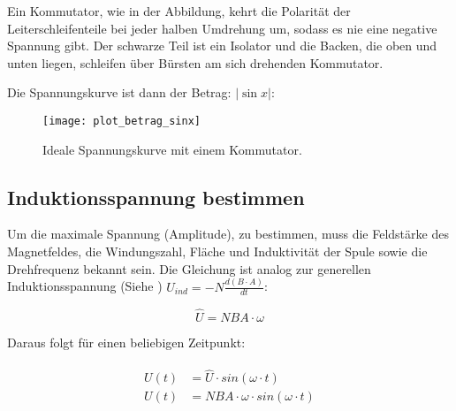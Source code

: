 Ein Kommutator, wie in der Abbildung, kehrt die Polarität der Leiterschleifenteile bei jeder halben Umdrehung um, sodass es nie eine negative Spannung gibt. Der schwarze Teil ist ein Isolator und die Backen, die oben und unten liegen, schleifen über Bürsten am sich drehenden Kommutator.

Die Spannungskurve ist dann der Betrag: $|\sin x|$:

\begin{figure}[h!]
	\centering
	\texttt{[image: plot\_betrag\_sinx]}
	\begin{comment}
Gnuplot: './plot_abssinx.p'
	\end{comment}
	\caption{Ideale Spannungskurve mit einem Kommutator.} 
\end{figure}


\subsection{Induktionsspannung bestimmen}

Um die maximale Spannung (Amplitude), zu bestimmen, muss die Feldstärke des Magnetfeldes, die Windungszahl, Fläche und Induktivität der Spule sowie die Drehfrequenz bekannt sein. Die Gleichung ist analog zur generellen Induktionsspannung (Siehe ) $U_{ind} = -N \frac{d(B \cdot A)}{dt}$:

\begin{equation}	\label{eq:hatU}
	\hat{U} = NBA \cdot \omega
\end{equation}

\noindent Daraus folgt für einen beliebigen Zeitpunkt:

\begin{align}		\label{eq:hatUbeliebig}
\begin{split}
	U(t) &= \hat{U} \cdot sin(\omega \cdot t) \\
	U(t) &= NBA \cdot \omega \cdot sin(\omega \cdot t)
\end{split}
\end{align}



